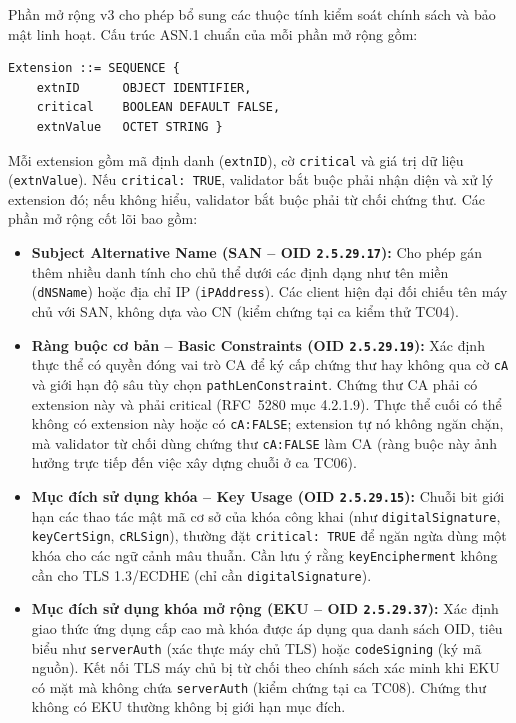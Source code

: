 Phần mở rộng v3 cho phép bổ sung các thuộc tính kiểm soát chính sách và bảo mật linh hoạt. Cấu trúc ASN.1 chuẩn của mỗi phần mở rộng gồm:
\begin{verbatim}
Extension ::= SEQUENCE {
    extnID      OBJECT IDENTIFIER,
    critical    BOOLEAN DEFAULT FALSE,
    extnValue   OCTET STRING }
\end{verbatim}

Mỗi extension gồm mã định danh (\texttt{extnID}), cờ \texttt{critical} và giá trị dữ liệu (\texttt{extnValue}). Nếu \texttt{critical: TRUE}, validator bắt buộc phải nhận diện và xử lý extension đó; nếu không hiểu, validator bắt buộc phải từ chối chứng thư. Các phần mở rộng cốt lõi bao gồm:
\begin{itemize}
    \item \textbf{Subject Alternative Name (SAN -- OID \texttt{2.5.29.17}):} Cho phép gán thêm nhiều danh tính cho chủ thể dưới các định dạng như tên miền (\texttt{dNSName}) hoặc địa chỉ IP (\texttt{iPAddress}). Các client hiện đại đối chiếu tên máy chủ với SAN, không dựa vào CN (kiểm chứng tại ca kiểm thử TC04).

    \item \textbf{Ràng buộc cơ bản -- Basic Constraints (OID \texttt{2.5.29.19}):} Xác định thực thể có quyền đóng vai trò CA để ký cấp chứng thư hay không qua cờ \texttt{cA} và giới hạn độ sâu tùy chọn \texttt{pathLenConstraint}. Chứng thư CA phải có extension này và phải critical (RFC~5280 mục 4.2.1.9). Thực thể cuối có thể không có extension này hoặc có \texttt{cA:FALSE}; extension tự nó không ngăn chặn, mà validator từ chối dùng chứng thư \texttt{cA:FALSE} làm CA (ràng buộc này ảnh hưởng trực tiếp đến việc xây dựng chuỗi ở ca TC06).

    \item \textbf{Mục đích sử dụng khóa -- Key Usage (OID \texttt{2.5.29.15}):} Chuỗi bit giới hạn các thao tác mật mã cơ sở của khóa công khai (như \texttt{digitalSignature}, \texttt{keyCertSign}, \texttt{cRLSign}), thường đặt \texttt{critical: TRUE} để ngăn ngừa dùng một khóa cho các ngữ cảnh mâu thuẫn. Cần lưu ý rằng \texttt{keyEncipherment} không cần cho TLS 1.3/ECDHE (chỉ cần \texttt{digitalSignature}).

    \item \textbf{Mục đích sử dụng khóa mở rộng (EKU -- OID \texttt{2.5.29.37}):} Xác định giao thức ứng dụng cấp cao mà khóa được áp dụng qua danh sách OID, tiêu biểu như \texttt{serverAuth} (xác thực máy chủ TLS) hoặc \texttt{codeSigning} (ký mã nguồn). Kết nối TLS máy chủ bị từ chối theo chính sách xác minh khi EKU có mặt mà không chứa \texttt{serverAuth} (kiểm chứng tại ca TC08). Chứng thư không có EKU thường không bị giới hạn mục đích.
\end{itemize}

